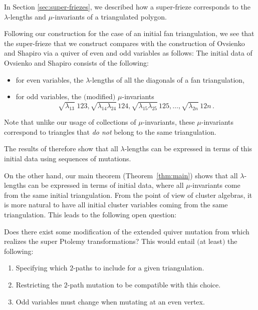 \documentclass[pdftex]{sigma}
\numberwithin{equation}{section}
\begin{document}
\begin{Remark}\rm
In Section \ref{sec:super-friezes}, we described how a super-frieze corresponds to the $\lambda$-lengths and $\mu$-invariants of a triangulated polygon.

Following our construction for the case of an initial fan triangulation, we see that the super-frieze that we construct compares with the construction of Ovsienko and Shapiro via a quiver of even and odd variables as follows:
The initial data of Ovsienko and Shapiro consists of the following:
\begin{itemize}\itemsep=0pt
 \item for even variables, the $\lambda$-lengths of all the diagonals of a fan triangulation,
 \item for odd variables, the $($modified$)$ $\mu$-invariants
 \[ \sqrt{\lambda_{13}} \; \boxed{123}, \sqrt{\lambda_{14}\lambda_{24}} \, \boxed{124},
 \sqrt{\lambda_{15}\lambda_{25}} \, \boxed{125}, \dots, \sqrt{\lambda_{2n}} \, \boxed{12n}\,.
 \]
\end{itemize}
Note that {unlike our usage of collections of $\mu$-invariants}, these $\mu$-invariants correspond to triangles that \emph{do not} belong to the same triangulation.
\end{Remark}

The results of \cite{OS19} therefore show that all $\lambda$-lengths can be expressed in terms of this initial data using sequences of mutations.

On the other hand, our main theorem (Theorem~\ref{thm:main}) shows that all $\lambda$-lengths can be expressed in terms of initial data, where all $\mu$-invariants
come from the same initial triangulation. From the point of view of cluster algebras, it is more natural to have all initial cluster variables coming from
the same triangulation. This leads to the following open question:

\begin{Question}
 Does there exist some modification of the extended quiver mutation from {\rm \cite{OS19}} which realizes the super Ptolemy transformations?
 This would entail $($at least$)$ the following:
 \begin{enumerate}\itemsep=0pt
 \item[$1.$] Specifying which $2$-paths to include for a given triangulation.
 \item[$2.$] Restricting the $2$-path mutation to be compatible with this choice.
 \item[$3.$] Odd variables must change when mutating at an even vertex.
 \end{enumerate}
\end{Question}
\end{document}
